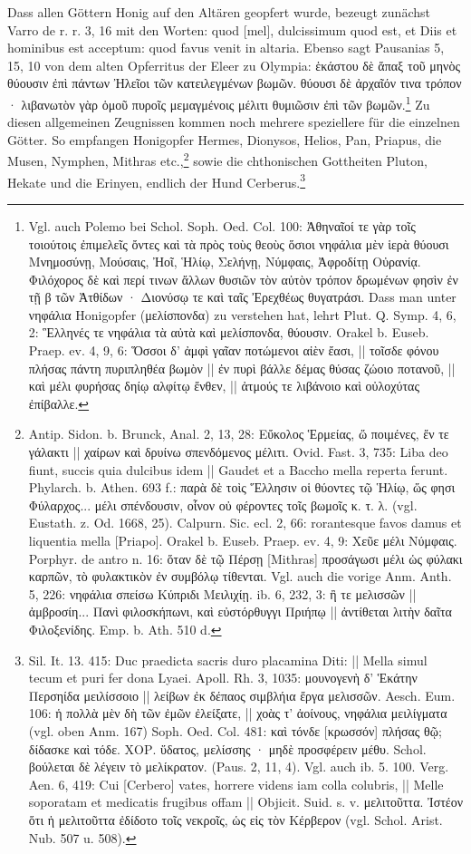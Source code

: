 \documentclass[a4paper, 11pt, oneside]{article}
\begin{document}
Dass allen Göttern Honig auf den Altären geopfert wurde, bezeugt zunächst Varro de r. r. 3, 16 mit den Worten: quod [mel], dulcissimum quod est, et Diis et hominibus est acceptum: quod favus venit in altaria. Ebenso sagt Pausanias 5, 15, 10 von dem alten Opferritus der Eleer zu Olympia: ἑκάστου δὲ ἅπαξ τοῦ μηνὸς θύουσιν ἐπὶ πάντων Ἠλεῖοι τῶν κατειλεγμένων βωμῶν. θύουσι δὲ ἀρχαῖόν τινα τρόπον · λιβανωτὸν γὰρ ὁμοῦ πυροῖς μεμαγμένοις μέλιτι θυμιῶσιν ἐπὶ τῶν βωμῶν.\footnote{Vgl. auch Polemo bei Schol. Soph. Oed. Col. 100: Ἀθηναῖοί τε γὰρ τοῖς τοιούτοις ἐπιμελεῖς ὄντες καὶ τὰ πρὸς τοὺς θεοὺς ὅσιοι νηφάλια μὲν ἱερὰ θύουσι Μνημοσύνῃ, Μούσαις, Ἠοῖ, Ἡλίῳ, Σελήνῃ, Νύμφαις, Ἀφροδίτῃ Οὐρανίᾳ. Φιλόχορος δὲ καὶ περί τινων ἄλλων θυσιῶν τὸν αὐτὸν τρόπον δρωμένων φησὶν ἐν τῇ β τῶν Ἀτθίδων · Διονύσῳ τε καὶ ταῖς Ἐρεχθέως θυγατράσι. Dass man unter νηφάλια Honigopfer (μελίσπονδα) zu verstehen hat, lehrt Plut. Q. Symp. 4, 6, 2: Ἓλληνές τε νηφάλια τὰ αὐτὰ καὶ μελίσπονδα, θύουσιν. Orakel b. Euseb. Praep. ev. 4, 9, 6: Ὅσσοι δ' ἀμφὶ γαῖαν ποτώμενοι αἰὲν ἔασι, || τοῖσδε φόνου πλήσας πάντη πυριπληθέα βωμὸν || ἐν πυρὶ βάλλε δέμας θύσας ζώοιο ποτανοῦ, || καὶ μέλι φυρήσας δηίῳ αλφίτῳ ἔνθεν, || ἀτμούς τε λιβάνοιο καὶ οὐλοχύτας ἐπίβαλλε.} Zu diesen allgemeinen Zeugnissen kommen noch mehrere speziellere für die einzelnen Götter. So empfangen Honigopfer Hermes, Dionysos, Helios, Pan, Priapus, die Musen, Nymphen, Mithras etc.,\footnote{Antip. Sidon. b. Brunck, Anal. 2, 13, 28: Εὔκολος Ἑρμείας, ὥ ποιμένες, ἔν τε γάλακτι || χαίρων καὶ δρυίνω σπενδόμενος μέλιτι. Ovid. Fast. 3, 735: Liba deo fiunt, succis quia dulcibus idem || Gaudet et a Baccho mella reperta ferunt. Phylarch. b. Athen. 693 f.: παρὰ δὲ τοὶς Ἕλλησιν οἱ θύοντες τῷ Ἡλίῳ, ὥς φησι Φύλαρχος... μέλι σπένδουσιν, οἷνον οὐ φέροντες τοῖς βωμοῖς κ. τ. λ. (vgl. Eustath. z. Od. 1668, 25). Calpurn. Sic. ecl. 2, 66: rorantesque favos damus et liquentia mella [Priapo]. Orakel b. Euseb. Praep. ev. 4, 9: Χεῦε μέλι Νύμφαις. Porphyr. de antro n. 16: ὅταν δὲ τῷ Πέρσῃ [Mithras] προσάγωσι μέλι ὡς φύλακι καρπῶν, τὸ φυλακτικὸν ἐν συμβόλῳ τίθενται. Vgl. auch die vorige Anm. Anth. 5, 226: νηφάλια σπείσω Κύπριδι Μειλιχίῃ. ib. 6, 232, 3: ἢ τε μελισσῶν || ἀμβροσίη... Πανὶ φιλοσκήπωνι, καὶ εὐστόρθυγγι Πριήπῳ || ἀντίθεται λιτὴν δαῖτα Φιλοξενίδης. Emp. b. Ath. 510 d.} sowie die chthonischen Gottheiten Pluton, Hekate und die Erinyen, endlich der Hund Cerberus.\footnote{Sil. It. 13. 415: Duc praedicta sacris duro placamina Diti: || Mella simul tecum et puri fer dona Lyaei. Apoll. Rh. 3, 1035: μουνογενὴ δ' Ἑκάτην Περσηίδα μειλίσσοιο || λείβων ἐκ δέπαος σιμβλήια ἔργα μελισσῶν. Aesch. Eum. 106: ἡ πολλὰ μὲν δὴ τῶν ἐμῶν ἐλείξατε, || χοὰς τ' ἀοίνους, νηφάλια μειλίγματα (vgl. oben Anm. 167) Soph. Oed. Col. 481: καὶ τόνδε [κρωσσόν] πλήσας θῷ; δίδασκε καὶ τόδε. ΧΟΡ. ὕδατος, μελίσσης · μηδὲ προσφέρειν μέθυ. Schol. βούλεται δὲ λέγειν τὸ μελίκρατον. (Paus. 2, 11, 4). Vgl. auch ib. 5. 100. Verg. Aen. 6, 419: Cui [Cerbero] vates, horrere videns iam colla colubris, || Melle soporatam et medicatis frugibus offam || Objicit. Suid. s. v. μελιτοῦττα. Ἰστέον ὅτι ἡ μελιτοῦττα ἐδίδοτο τοῖς νεκροῖς, ὡς εἰς τὸν Κέρβερον (vgl. Schol. Arist. Nub. 507 u. 508).}
\end{document}
